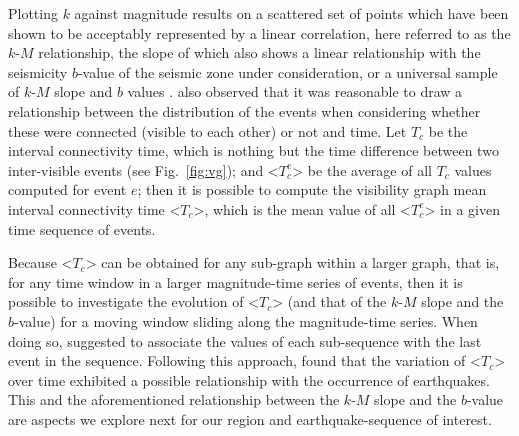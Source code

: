 Plotting $k$ against magnitude results on a scattered set of points which have been shown to be acceptably represented by a linear correlation, here referred to as the $k$-$M$ relationship, the slope of which also shows a linear relationship with the seismicity $b$-value of the seismic zone under consideration, or a universal sample of $k$-$M$ slope and $b$ values \citep{Telesca2013, Telesca2014}. \citet{Telesca2014} also observed that it was reasonable to draw a relationship between the distribution of the events when considering whether these were connected (visible to each other) or not and time. Let $T_c$ be the interval connectivity time, which is nothing but the time difference between two inter-visible events (see Fig.~\ref{fig:vg}); and <$T_c^e$> be the average of all $T_c$ values computed for event $e$; then it is possible to compute the visibility graph mean interval connectivity time <$T_c$>, which is the mean value of all <$T_c^e$> in a given time sequence of events.

Because <$T_c$> can be obtained for any sub-graph within a larger graph, that is, for any time window in a larger magnitude-time series of events, then it is possible to investigate the evolution of <$T_c$> (and that of the $k$-$M$ slope and the $b$-value) for a moving window sliding along the magnitude-time series. When doing so, \citet{Telesca2014} suggested to associate the values of each sub-sequence with the last event in the sequence. Following this approach, \citet{Telesca2014, Telesca2016} found that the variation of <$T_c$> over time exhibited a possible relationship with the occurrence of earthquakes. This and the aforementioned relationship between the $k$-$M$ slope and the $b$-value are aspects we explore next for our region and earthquake-sequence of interest.


